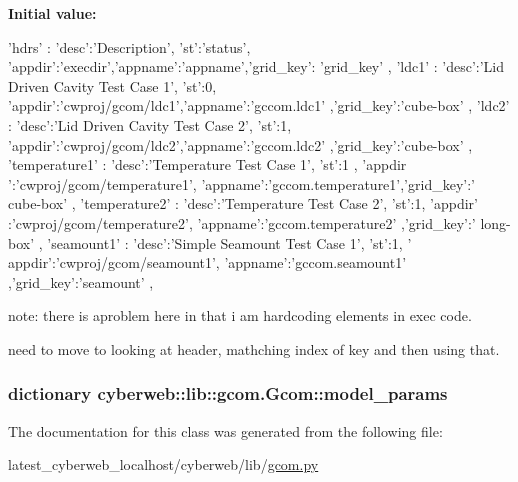 {\bfseries \-Initial value\-:}
\begin{DoxyCode}
{
          'hdrs'         : { 'desc':'Description', 'st':'status',
                             'appdir':'execdir','appname':'appname','grid_key':
      'grid_key' },
          'ldc1'         : { 'desc':'Lid Driven Cavity Test Case 1', 'st':0, 
                             'appdir':'cwproj/gcom/ldc1','appname':'gccom.ldc1'
      ,'grid_key':'cube-box'  },
          'ldc2'         : { 'desc':'Lid Driven Cavity Test Case 2', 'st':1, 
                             'appdir':'cwproj/gcom/ldc2','appname':'gccom.ldc2'
      ,'grid_key':'cube-box'  },
          'temperature1' : { 'desc':'Temperature Test Case 1', 'st':1 , 'appdir
      ':'cwproj/gcom/temperature1',
                             'appname':'gccom.temperature1','grid_key':'
      cube-box' },
          'temperature2' : { 'desc':'Temperature Test Case 2', 'st':1, 'appdir'
      :'cwproj/gcom/temperature2',
                             'appname':'gccom.temperature2' ,'grid_key':'
      long-box' },
          'seamount1'    : { 'desc':'Simple Seamount Test Case 1', 'st':1, '
      appdir':'cwproj/gcom/seamount1',
                             'appname':'gccom.seamount1' ,'grid_key':'seamount'
       },
          }
\end{DoxyCode}


note\-: there is aproblem here in that i am hardcoding elements in exec code. 

need to move to looking at header, mathching index of key and then using that. \hypertarget{classcyberweb_1_1lib_1_1gcom_1_1_gcom_a04fa69d734f69881e0a237082d1109ff}{
\subsubsection[{model\-\_\-params}]{\setlength{\rightskip}{0pt plus 5cm}dictionary {\bf cyberweb\-::lib\-::gcom.\-Gcom\-::model\-\_\-params}}}\label{classcyberweb_1_1lib_1_1gcom_1_1_gcom_a04fa69d734f69881e0a237082d1109ff}


\-The documentation for this class was generated from the following file\-:\begin{DoxyCompactItemize}
\item 
latest\-\_\-cyberweb\-\_\-localhost/cyberweb/lib/\hyperlink{lib_2gcom_8py}{gcom.\-py}\end{DoxyCompactItemize}
